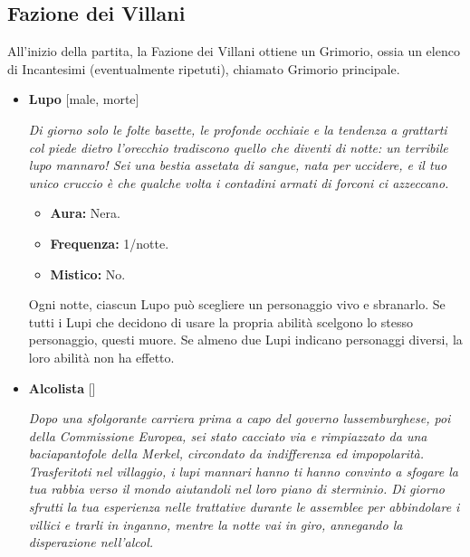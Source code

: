 \documentclass[a4paper,10pt]{article}
\begin{document}
\subsection*{Fazione dei Villani}

All'inizio della partita, la Fazione dei Villani ottiene un Grimorio, ossia un elenco di Incantesimi (eventualmente ripetuti), chiamato Grimorio principale.

\begin{itemize}

      \item \textbf{Lupo} [male, morte]

            \emph{Di giorno solo le folte basette, le profonde occhiaie e la tendenza a grattarti col piede dietro l'orecchio tradiscono quello che diventi di notte: un terribile lupo mannaro! Sei una bestia assetata di sangue, nata per uccidere, e il tuo unico cruccio è che qualche volta i contadini armati di forconi ci azzeccano.}

            \begin{multicols}{3}
                  \begin{itemize}
                        \item \textbf{Aura:} Nera.
                        \item \textbf{Frequenza:} 1/notte.
                        \item \textbf{Mistico:} No.
                  \end{itemize}
            \end{multicols}

            Ogni notte, ciascun Lupo può scegliere un personaggio vivo e sbranarlo. Se tutti i Lupi che decidono di usare la propria abilità scelgono lo stesso personaggio, questi muore. Se almeno due Lupi indicano personaggi diversi, la loro abilità non ha effetto.

      \item \textbf{Alcolista} []

            \emph{Dopo una sfolgorante carriera prima a capo del governo lussemburghese, poi della Commissione Europea, sei stato cacciato via e rimpiazzato da una baciapantofole della Merkel, circondato da indifferenza ed impopolarità. Trasferitoti nel villaggio, i lupi mannari hanno ti hanno convinto a sfogare la tua rabbia verso il mondo aiutandoli nel loro piano di sterminio. Di giorno sfrutti la tua esperienza nelle trattative durante le assemblee per abbindolare i villici e trarli in inganno, mentre la notte vai in giro, annegando la disperazione nell'alcol.}


\end{itemize}
\end{document}
